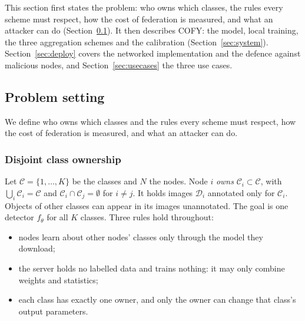 \documentclass[pdflatex,sn-mathphys-num]{sn-jnl}
\newcommand{\sys}{COFY}
\begin{document}
This section first states the problem: who owns which classes, the rules every scheme must respect, how the cost of federation is measured, and what an attacker can do (Section~\ref{sec:problem}). It then describes \sys{}: the model, local training, the three aggregation schemes and the calibration (Section~\ref{sec:system}). Section~\ref{sec:deploy} covers the networked implementation and the defence against malicious nodes, and Section~\ref{sec:usecases} the three use cases.

\subsection{Problem setting}\label{sec:problem}
We define who owns which classes and the rules every scheme must respect, how the cost of federation is measured, and what an attacker can do.

\subsubsection{Disjoint class ownership}
Let $\mathcal{C}=\{1,\dots,K\}$ be the classes and $N$ the nodes. Node $i$ \emph{owns} $\mathcal{C}_i\subset\mathcal{C}$, with $\bigcup_i\mathcal{C}_i=\mathcal{C}$ and $\mathcal{C}_i\cap\mathcal{C}_j=\emptyset$ for $i\neq j$. It holds images $\mathcal{D}_i$ annotated only for $\mathcal{C}_i$. Objects of other classes can appear in its images unannotated. The goal is one detector $f_\theta$ for all $K$ classes. Three rules hold throughout:
\begin{itemize}
\item[R1] nodes learn about other nodes' classes only through the model they download;
\item[R2] the server holds no labelled data and trains nothing: it may only combine weights and statistics;
\item[R3] each class has exactly one owner, and only the owner can change that class's output parameters.
\end{itemize}
\end{document}
